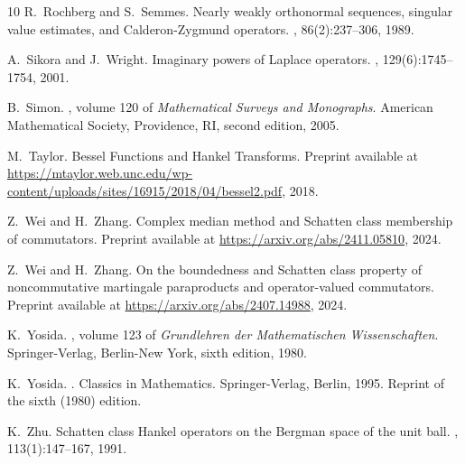 \documentclass[12pt]{amsart}
\begin{document}
\begin{thebibliography}{10}
R.~Rochberg and S.~Semmes.
\newblock Nearly weakly orthonormal sequences, singular value estimates, and
  {C}alderon-{Z}ygmund operators.
, 86(2):237--306, 1989.

A.~Sikora and J.~Wright.
\newblock Imaginary powers of {L}aplace operators.
, 129(6):1745--1754, 2001.

{\color{blue}B.~Simon.
, volume 120 of {\em
  Mathematical Surveys and Monographs}.
\newblock American Mathematical Society, Providence, RI, second edition, 2005.}

M.~Taylor.
\newblock Bessel {F}unctions and {H}ankel {T}ransforms.
\newblock Preprint available at
  \url{https://mtaylor.web.unc.edu/wp-content/uploads/sites/16915/2018/04/bessel2.pdf},
  2018.

Z.~Wei and H.~Zhang.
\newblock Complex median method and {S}chatten class membership of commutators.
\newblock Preprint available at \url{https://arxiv.org/abs/2411.05810}, 2024.

Z.~Wei and H.~Zhang.
\newblock On the boundedness and {S}chatten class property of noncommutative
  martingale paraproducts and operator-valued commutators.
\newblock Preprint available at \url{https://arxiv.org/abs/2407.14988}, 2024.

K.~Yosida.
, volume 123 of {\em Grundlehren der
  Mathematischen Wissenschaften}.
\newblock Springer-Verlag, Berlin-New York, sixth edition, 1980.

K.~Yosida.
.
\newblock Classics in Mathematics. Springer-Verlag, Berlin, 1995.
\newblock Reprint of the sixth (1980) edition.

K.~Zhu.
\newblock Schatten class {H}ankel operators on the {B}ergman space of the unit
  ball.
, 113(1):147--167, 1991.

\end{thebibliography}
\end{document}
